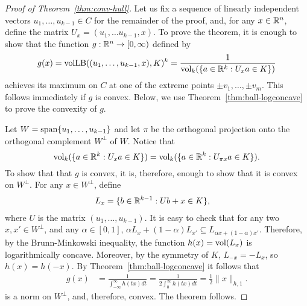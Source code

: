 \begin{proof}[Proof of Theorem~\ref{thm:conv-hull}]
  Let us fix a sequence of linearly independent vectors $u_1,
  \ldots, u_{k-1} \in C$ for the remainder of the proof,
  and, for any $x\in {\mathbb{R}}^n$, define the matrix $U_x = (u_1, \ldots
  u_{k-1}, x)$.  To prove the theorem, it is enough to show that the
  function $g: {\mathbb{R}}^n \to [0, \infty)$ defined by
  \[
  g(x) = \operatorname{volLB}((u_1, \ldots, u_{k-1}, x), K)^k 
  = \frac{1}{\operatorname{vol}_k(\{a \in {\mathbb{R}}^k: U_x a \in K\})}
  \]
  achieves its maximum on $C$ at one of the extreme points $\pm v_1,
  \ldots, \pm v_m$. This follows immediately if $g$ is
  convex. Below, we use Theorem~\ref{thm:ball-logconcave} to prove the
  convexity of $g$.
  
  Let  $W = \operatorname{span}\{u_1, \ldots, u_{k-1}\}$ and let $\pi$ be
  the orthogonal projection onto the orthogonal complement $W^\perp$
  of $W$. Notice that 
  \[
  \operatorname{vol}_k(\{a \in {\mathbb{R}}^k: U_x a \in K\}) 
  = \operatorname{vol}_k(\{a \in {\mathbb{R}}^k: U_{\pi x} a \in K\}).
  \]
  To show that that $g$ is convex, it is, therefore, enough to show
  that it is convex on $W^\perp$.  For any $x \in W^\perp$, define 
  \begin{align*}
    L_x &= \{b \in {\mathbb{R}}^{k-1}: Ub + x \in K\},
  \end{align*}
  where $U$ is the matrix $(u_1, \ldots, u_{k-1})$. It is
  easy to check that for any two $x, x' \in W^\perp$, and any $\alpha
  \in [0,1]$, $\alpha L_{x} + (1-\alpha) L_{x'} \subseteq L_{\alpha x
    + (1-\alpha)x'}$. Therefore, by the Brunn-Minkowski inequality,
  the function $h(x) = \operatorname{vol}(L_x)$ is logarithmically
  concave. Moreover, by the symmetry of $K$, $L_{-x} = -L_x$, so $h(x)
  = h(-x)$.  By Theorem~\ref{thm:ball-logconcave} it follows that 
  \begin{align*}
  g(x) &=\frac{1}{\int_{-\infty}^\infty h(tx) dt}
  = \frac{1}{2\int_{0}^\infty h(tx) dt}
  = \frac{1}{2}\|x\|_{h,1}.
  \end{align*}
  is a norm on $W^\perp$, and, therefore, convex. The theorem follows.
\end{proof}


